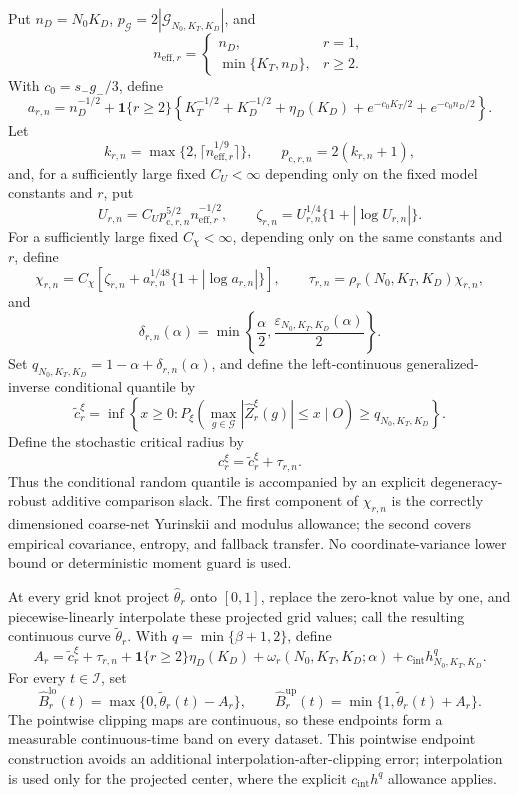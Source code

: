 Put \(n_D=N_0K_D\), \(p_{\mathcal G}=2|\mathcal G_{N_0,K_T,K_D}|\), and
\[
 n_{\mathrm{eff},r}=
 \begin{cases}
 n_D,&r=1,\\
 \min\{K_T,n_D\},&r\ge2.
 \end{cases}
\]
With \(c_0=s_-g_-/3\), define
\[
 a_{r,n}=n_D^{-1/2}+\mathbf1\{r\ge2\}
 \left\{K_T^{-1/2}+K_D^{-1/2}+\eta_D(K_D)
 +e^{-c_0K_T/2}+e^{-c_0n_D/2}\right\}.
\]
Let
\[
 k_{r,n}=\max\{2,\lceil n_{\mathrm{eff},r}^{1/9}\rceil\},
 \qquad p_{\mathrm c,r,n}=2(k_{r,n}+1),
\]
and, for a sufficiently large fixed \(C_U<\infty\) depending only on the fixed model constants and \(r\), put
\[
 U_{r,n}=C_U p_{\mathrm c,r,n}^{5/2}n_{\mathrm{eff},r}^{-1/2},
 \qquad
 \zeta_{r,n}=U_{r,n}^{1/4}\{1+|\log U_{r,n}|\}.
\]
For a sufficiently large fixed \(C_\chi<\infty\), depending only on the same constants and \(r\), define
\[
 \chi_{r,n}=C_\chi\left[
 \zeta_{r,n}+a_{r,n}^{1/48}\{1+|\log a_{r,n}|\}\right],
 \qquad
 \tau_{r,n}=\rho_r(N_0,K_T,K_D)\chi_{r,n},
\]
and
\[
 \delta_{r,n}(\alpha)=
 \min\left\{\frac\alpha2,
 \frac{\varepsilon_{N_0,K_T,K_D}(\alpha)}2\right\}.
\]
Set \(q_{N_0,K_T,K_D}=1-\alpha+\delta_{r,n}(\alpha)\), and define the left-continuous generalized-inverse conditional quantile by
\[
 \widetilde c_r^\xi=
 \inf\left\{x\ge0:
 P_\xi\left(\max_{g\in\mathcal G}|\widehat Z_r^\xi(g)|\le x
 \mid O\right)\ge q_{N_0,K_T,K_D}\right\}.
\]
Define the stochastic critical radius by
\[
 c_r^\xi=\widetilde c_r^\xi+\tau_{r,n}.
\]
Thus the conditional random quantile is accompanied by an explicit degeneracy-robust additive comparison slack. The first component of \(\chi_{r,n}\) is the correctly dimensioned coarse-net Yurinskii and modulus allowance; the second covers empirical covariance, entropy, and fallback transfer. No coordinate-variance lower bound or deterministic moment guard is used.

At every grid knot project \(\widehat\theta_r\) onto \([0,1]\), replace the zero-knot value by one, and piecewise-linearly interpolate these projected grid values; call the resulting continuous curve \(\widetilde\theta_r\). With \(q=\min\{\beta+1,2\}\), define
\[
 A_r=\widetilde c_r^\xi+\tau_{r,n}
 +\mathbf1\{r\ge2\}\eta_D(K_D)
 +\omega_r(N_0,K_T,K_D;\alpha)
 +c_{\mathrm{int}}h_{N_0,K_T,K_D}^{q}.
\]
For every \(t\in\mathcal I\), set
\[
 \widehat B_r^{\mathrm{lo}}(t)=
 \max\{0,\widetilde\theta_r(t)-A_r\},\qquad
 \widehat B_r^{\mathrm{up}}(t)=
 \min\{1,\widetilde\theta_r(t)+A_r\}.
\]
The pointwise clipping maps are continuous, so these endpoints form a measurable continuous-time band on every dataset. This pointwise endpoint construction avoids an additional interpolation-after-clipping error; interpolation is used only for the projected center, where the explicit \(c_{\mathrm{int}}h^q\) allowance applies.